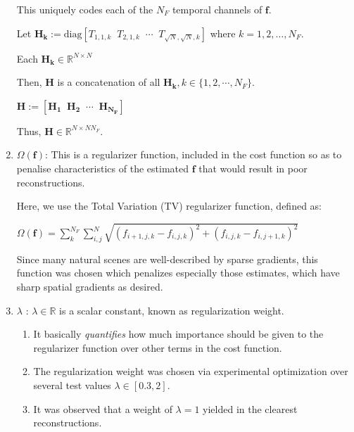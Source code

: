 \documentclass[fleqn, 11pt]{article}
\begin{document}
\begin{enumerate}
This uniquely codes each of the $N_F$ temporal channels of $\mathbf{f}$. 

\smallskip

Let \hspace{5pt} $\mathbf{H_k} := \text{diag} [T_{1,1,k} \; \; T_{2,1,k} \;\; \cdots \;\; T_{\sqrt{N},\sqrt{N},k}] $ 
    where $k=1,2, \ldots, N_F$.
    
    \smallskip
    
    Each $\mathbf{H_k} \in \mathbb{R}^{N \times N}$
    
\smallskip

Then, $\mathbf{H}$ is a concatenation of all $\mathbf{H_k} , k \in \{1, 2, \cdots , N_F \}$.

\smallskip

 \hspace{10pt}   $\mathbf{H} := [\mathbf{H_1} \; \;  \mathbf{H_2}  \; \; \cdots \; \; \mathbf{H_{N_F}}]$

\smallskip

Thus, $\mathbf{H} \in \mathbb{R}^{N \times N N_F} $.

\newpage 

\item $\Omega(\mathbf{f})$: This is a regularizer function, included in the cost function so as to penalise characteristics of the estimated $\mathbf{f}$ 
that would result in poor reconstructions.  

Here, we use the Total Variation (TV) regularizer function, defined as:

\begin{center}
    $\Omega(\mathbf{f}) = \displaystyle \sum_{k}^{N_F} \sum_{i,j}^{N} \sqrt{ (f_{i+1,j,k}-f_{i,j,k})^2 + (f_{i,j,k}-f_{i,j+1,k})^2  }$
\end{center}


Since many natural scenes are well-described by sparse gradients, 
this function was chosen which penalizes especially those estimates, which have sharp spatial gradients
as desired.

\item $\lambda$ : $\lambda \in \mathbb{R}$ is a scalar constant, known as regularization weight.

\begin{enumerate}
    \item It basically \textit{quantifies} how much importance should be given to the regularizer function over 
    other terms in the cost function.
    \item The regularization weight was chosen via experimental optimization over
    several test values $\lambda \in [0.3, 2]$.
    \item It was observed that a weight of $\lambda =1$ yielded in the clearest reconstructions. 
\end{enumerate}

 
  

\end{enumerate}
\end{document}
